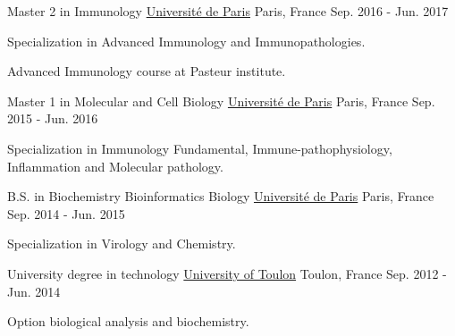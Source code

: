 

\begin{cventries}

  \cventry
    {Master 2 in Immunology} %
    {\href{https://u-paris.fr/en/universite-de-paris/}{Université de Paris}} %
    {Paris, France} %
    {Sep. 2016 - Jun. 2017} %
    {
      \begin{cvitems} %
        \item {Specialization in Advanced Immunology and Immunopathologies.}
        \item {Advanced Immunology course at Pasteur institute.}
      \end{cvitems}
    }

  \cventry
    {Master 1 in  Molecular and Cell Biology} %
    {\href{https://u-paris.fr/en/universite-de-paris/}{Université de Paris}} %
    {Paris, France} %
    {Sep. 2015 - Jun. 2016} %
    {
      \begin{cvitems} %
        \item {Specialization in Immunology Fundamental, Immune-pathophysiology, Inflammation and Molecular pathology.}
      \end{cvitems}
    }

  \cventry
    {B.S. in Biochemistry Bioinformatics Biology} %
    {\href{https://u-paris.fr/en/universite-de-paris/}{Université de Paris}} %
    {Paris, France} %
    {Sep. 2014 - Jun. 2015} %
    {
      \begin{cvitems} %
        \item {Specialization in Virology and Chemistry.}
      \end{cvitems}
    }
    
  \cventry
    {University degree in technology} %
    {\href{http://www.univ-tln.fr/}{University of Toulon}} %
    {Toulon, France} %
    {Sep. 2012 - Jun. 2014} %
    {
      \begin{cvitems} %
        \item {Option biological analysis and biochemistry.}
      \end{cvitems}
    }

\end{cventries}
